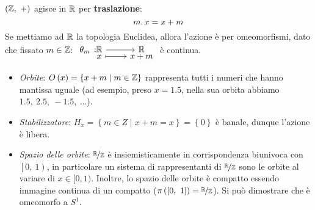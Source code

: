 \begin{example}
	$\left(\mathbb{Z},\ +\right)$ agisce in $\mathbb{R}$ per \textbf{traslazione}:
	\begin{equation}
		m\ldotp x = x+m
	\end{equation}
Se mettiamo ad $\mathbb{R}$ la topologia Euclidea, allora l'azione è per omeomorfismi, dato che fissato $m\in \mathbb{Z}$: $\funztot{\theta_m}{\realset}{\realset}{x}{x+m}$ è continua.
\begin{itemize}
	\item \textit{Orbite}: $O\left(x\right)=\left\{x+m\mid m\in \mathbb{Z}\right\}$ rappresenta tutti i numeri che hanno mantissa uguale (ad esempio, preso $x=1.5$, nella sua orbita abbiamo $1.5,\ 2.5,\ -1.5,\ \ldots$).
	\item \textit{Stabilizzatore}: $H_x=\left\{m\in Z\mid x+m=x\right\}=\left\{0\right\}$ è banale, dunque l'azione è libera.
	\item \textit{Spazio delle orbite}: $\nicefrac{\mathbb{R}}{\mathbb{Z}}$ è insiemisticamente in corrispondenza biunivoca con $\left[0,\ 1\right)$, in particolare un sistema di rappresentanti di $\nicefrac{\mathbb{R}}{\mathbb{Z}}$ sono le orbite al variare di $x\in[0,1)$. Inoltre, lo spazio delle orbite è compatto essendo immagine continua di un compatto ($\pi\left(\left[0,\ 1\right]\right)=\nicefrac{\realset}{\integerset}$). Si può dimostrare che è omeomorfo a $S^1$.
\end{itemize}
\end{example}
